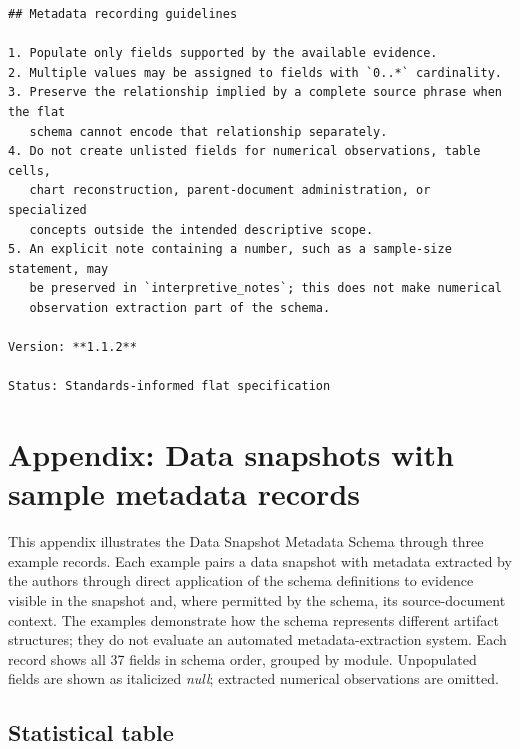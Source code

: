 \documentclass{article}
\begin{document}
\begin{lstlisting}
## Metadata recording guidelines

1. Populate only fields supported by the available evidence.
2. Multiple values may be assigned to fields with `0..*` cardinality.
3. Preserve the relationship implied by a complete source phrase when the flat
   schema cannot encode that relationship separately.
4. Do not create unlisted fields for numerical observations, table cells,
   chart reconstruction, parent-document administration, or specialized
   concepts outside the intended descriptive scope.
5. An explicit note containing a number, such as a sample-size statement, may
   be preserved in `interpretive_notes`; this does not make numerical
   observation extraction part of the schema.

Version: **1.1.2**

Status: Standards-informed flat specification
\end{lstlisting}

\section{Appendix: Data snapshots with sample metadata records}
\label{appendix:sample_metadata}

This appendix illustrates the Data Snapshot Metadata Schema through three example records. Each example pairs a data snapshot with metadata extracted by the authors through direct application of the schema definitions to evidence visible in the snapshot and, where permitted by the schema, its source-document context. The examples demonstrate how the schema represents different artifact structures; they do not evaluate an automated metadata-extraction system. Each record shows all 37 fields in schema order, grouped by module. Unpopulated fields are shown as italicized \textit{null}; extracted numerical observations are omitted.

\clearpage

\subsection{Statistical table}
\end{document}

